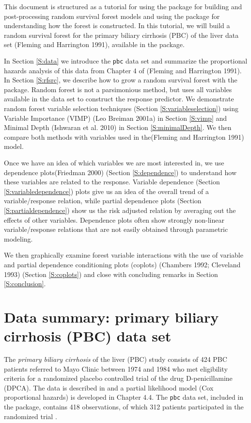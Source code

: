 \documentclass[article, nojss]{jss}
\begin{document}
This document is structured as a tutorial for using the
 package for building and post-processing random
survival forest models and using the  package for
understanding how the forest is constructed. In this tutorial, we will
build a random survival forest for the primary biliary cirrhosis (PBC)
of the liver data set (Fleming and Harrington 1991), available in the
 package.

In Section \ref{S:data} we introduce the \texttt{pbc} data set and
summarize the proportional hazards analysis of this data from Chapter 4
of (Fleming and Harrington 1991). In Section \ref{S:rfsrc}, we describe
how to grow a random survival forest with the 
package. Random forest is not a parsimonious method, but uses all
variables available in the data set to construct the response predictor.
We demonstrate random forest variable selection techniques (Section
\ref{S:variableselection}) using Variable Importance (VIMP) (Leo Breiman
2001a) in Section \ref{S:vimp} and Minimal Depth (Ishwaran et al. 2010)
in Section \ref{S:minimalDepth}. We then compare both methods with
variables used in the(Fleming and Harrington 1991) model.

Once we have an idea of which variables we are most interested in, we
use dependence plots(Friedman 2000) (Section \ref{S:dependence}) to
understand how these variables are related to the response. Variable
dependence (Section \ref{S:variabledependence}) plots give us an idea of
the overall trend of a variable/response relation, while partial
dependence plots (Section \ref{S:partialdependence}) show us the risk
adjusted relation by averaging out the effects of other variables.
Dependence plots often show strongly non-linear variable/response
relations that are not easily obtained through parametric modeling.

We then graphically examine forest variable interactions with the use of
variable and partial dependence conditioning plots (coplots) (Chambers
1992; Cleveland 1993) (Section \ref{S:coplots}) and close with
concluding remarks in Section \ref{S:conclusion}.

\section{Data summary: primary biliary cirrhosis (PBC) data
set}\label{data-summary-primary-biliary-cirrhosis-pbc-data-set}

The \emph{primary biliary cirrhosis} of the liver (PBC) study consists
of 424 PBC patients referred to Mayo Clinic between 1974 and 1984 who
met eligibility criteria for a randomized placebo controlled trial of
the drug D-penicillamine (DPCA). The data is described in
\cite[Chapter 0.2]{fleming:1991} and a partial likelihood model (Cox
proportional hazards) is developed in Chapter 4.4. The \texttt{pbc} data
set, included in the  package, contains 418
observations, of which 312 patients participated in the randomized trial
\cite[Appendix D]{fleming:1991}.
\end{document}
